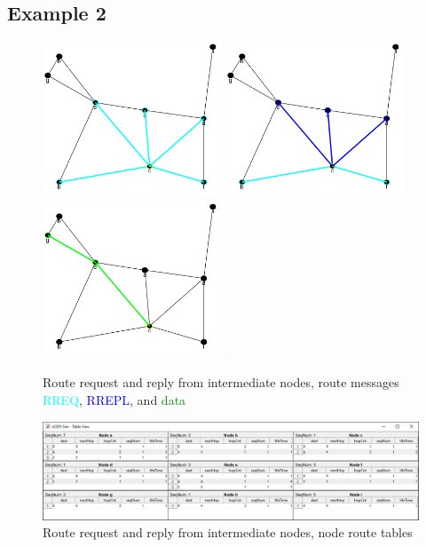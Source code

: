 \documentclass[conference]{IEEEtran}
\begin{document}
\subsection{Example 2}

\begin{figure}[ht]
	\centering
	\includegraphics[width=2.1in]{Ex_2_request.png}
	\includegraphics[width=2.1in]{Ex_2_reply.png}
	\includegraphics[width=2.1in]{Ex_2_data.png}
	\caption{Route request and reply from intermediate nodes, route messages \\
			\textcolor{cyan}{RREQ}, \textcolor{blue}{RREPL}, and \textcolor{green}{data} }
	\label{fig:ex_2}
\end{figure}

\begin{figure}[ht]
	\centering
	\includegraphics[width=6.8in]{Ex_2_table.png}
	\caption{Route request and reply from intermediate nodes, node route tables}
	\label{fig:ex_2_table}
\end{figure}
\end{document}
